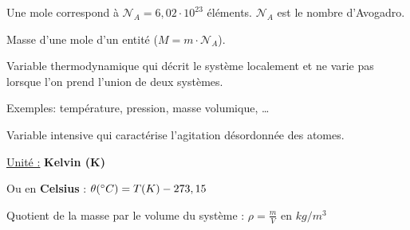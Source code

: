 \documentclass[12pt]{article}
\theoremstyle{cstyle}{\newtheorem{definition}{Définition}[section]}
\theoremstyle{cstyle}{\newtheorem{proposition}[definition]{Propriété}}
\theoremstyle{mystyle}{\newtheorem{theorem}[definition]{Théorème}}
\theoremstyle{mystyle}{\newtheorem{lemma}[definition]{Lemme}}
\theoremstyle{mystyle}{\newtheorem{corollary}[definition]{Corollaire}}
\theoremstyle{mystyle}{\newtheorem*{remark}{Remarque}}
\theoremstyle{mystyle}{\newtheorem*{remarks}{Remarques}}
\theoremstyle{mystyle}{\newtheorem*{example}{Exemple}}
\theoremstyle{mystyle}{\newtheorem*{examples}{Exemples}}
\theoremstyle{definition}{\newtheorem*{exercise}{Exercice}}
\theoremstyle{mystyle}{\newtheorem*{methode}{Méthode}}
\theoremstyle{cstyle}{\newtheorem*{cthm}{}}
\theoremstyle{warn}
\begin{document}
\begin{minipage}[t]{0.45\textwidth}
	\begin{definition}[Mole]
		Une mole correspond à \(\mathcal{N}_A = 6,02 \cdot 10^{23}\) éléments. \(\mathcal{N}_A\) est le nombre d'Avogadro.
	\end{definition}
	\begin{definition}
		Masse d'une mole d'un entité (\(M = m \cdot \mathcal{N}_A\)).
	\end{definition}
	\begin{definition}
		Variable thermodynamique qui décrit le système localement et ne varie pas lorsque l'on prend l'union de deux systèmes.
		
		Exemples: température, pression, masse volumique, \dots
	\end{definition}

	\begin{definition}[Température]
		Variable intensive qui caractérise l'agitation désordonnée des atomes. 
		
		\underline{Unité :} \textbf{Kelvin (K)}
		
		Ou en \textbf{Celsius} : \(\theta(\degree C) = T(K) - 273,15\)
	\end{definition}

	\begin{definition}
		Quotient de la masse par le volume du système : $\rho = \frac{m}{V}$ en \(kg/m^3\)
	\end{definition}

	
	
\end{minipage}
\end{document}
